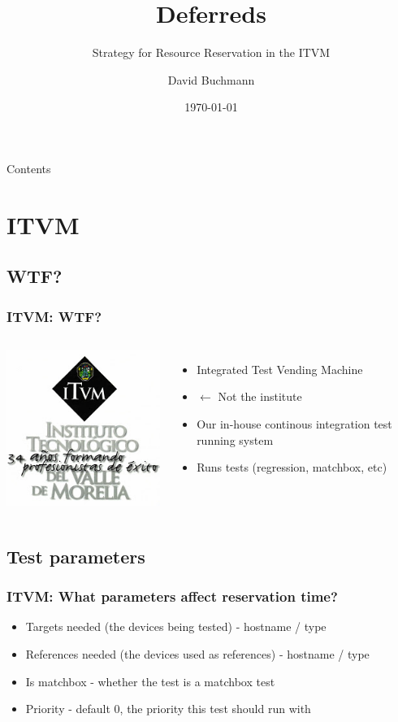 \documentclass[xcolor=pdftex,dvipsnames,table]{beamer}
\title{Deferreds}
\subtitle{Strategy for Resource Reservation in the ITVM}
\author{David Buchmann}
\institute{Cisco Systems}
\date{\today}
\begin{document}
\maketitle

\begin{frame}[allowframebreaks]{Contents}
  \tableofcontents
\end{frame}

\section{ITVM}

\subsection{WTF?}
\begin{frame}
  \frametitle{ITVM: WTF?}
  \begin{columns}[cc]
  \column{0.5in}
  \includegraphics[scale=0.33]{itvm.jpg}
  \column{2.0in}
  \begin{itemize}
    \item Integrated Test Vending Machine
    \item $\leftarrow$ Not the institute
    \item Our in-house continous integration test running system
    \item Runs tests (regression, matchbox, etc)
  \end{itemize}
  \end{columns}
\end{frame}

\subsection{Test parameters}
\begin{frame}
  \frametitle{ITVM: What parameters affect reservation time?}
  \begin{itemize}
    \item Targets needed (the devices being tested) - hostname / type
    \item References needed (the devices used as references) -
      hostname / type
    \item Is matchbox - whether the test is a matchbox test
    \item Priority - default 0, the priority this test should run with
  \end{itemize}
\end{frame}
\end{document}
